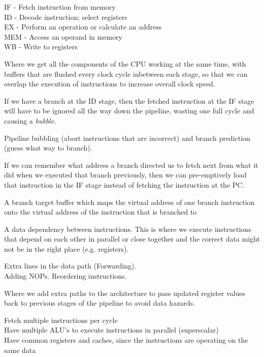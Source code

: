 {
  IF - Fetch instruction from memory\\
  ID - Decode instruction; select registers\\
  EX - Perform an operation or calculate an address\\
  MEM - Access an operand in memory\\
  WB - Write to registers
}

{
  Where we get all the components of the CPU working at the same time, with
  buffers that are flushed every clock cycle inbetween each stage, so that we
  can overlap the execution of instructions to increase overall clock speed.
}

{
  If we have a branch at the ID stage, then the fetched instruction at the
  IF stage will have to be ignored all the way down the pipeline, wasting one
  full cycle and causing a \textit{bubble}.
}

{
  Pipeline bubbling (abort instructions that are incorrect) and branch
  prediction (guess what way to branch).
}

{
  If we can remember what address a branch directed us to fetch next from what
  it did when we executed that branch previously, then we can pre-emptively
  load that instruction in the IF stage instead of fetching the instruction at
  the PC.
}

{
  A branch target buffer which maps the virtual address of one branch instruction onto the virtual address of the instruction that is branched to
}

{
  A data dependency between instructions. This is where we execute instructions that depend on each other in parallel or close together and the correct data might not be in the right place (e.g. registers).
}

{
  Extra lines in the data path (Forwarding). \\
  Adding NOPs. Reordering instructions.
}

{
  Where we add extra paths to the architecture to pass updated register values back to previous stages of the pipeline to avoid data hazards.
}

{
  Fetch multiple instructions per cycle\\
  Have multiple ALU's to execute instructions in parallel (superscalar)\\ 
  Have common registers and caches, since the instructions are operating on the same data
}

